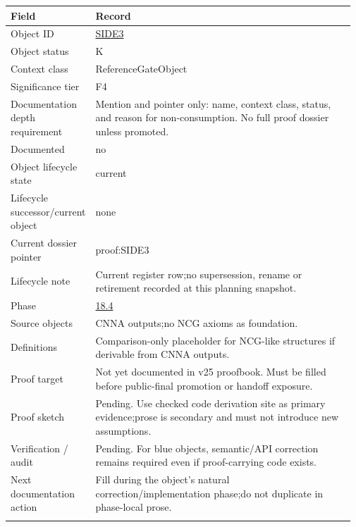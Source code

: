 \begin{longtable}{L{0.16\linewidth} L{0.81\linewidth}}
\hline
\textbf{Field} & \textbf{Record}\\
\hline
Object ID & \hyperlink{object-row-SIDE3}{SIDE3}\\
\hline\addlinespace[0.20em]
Object status & K\\
\hline\addlinespace[0.20em]
Context class & ReferenceGateObject\\
\hline\addlinespace[0.20em]
Significance tier & F4\\
\hline\addlinespace[0.20em]
Documentation depth requirement & Mention and pointer only: name, context class, status, and reason for non-consumption. No full proof dossier unless promoted.\\
\hline\addlinespace[0.20em]
Documented & no\\
\hline\addlinespace[0.20em]
Object lifecycle state & current\\
\hline\addlinespace[0.20em]
Lifecycle successor/\allowbreak{}current object & none\\
\hline\addlinespace[0.20em]
Current dossier pointer & proof:SIDE3\\
\hline\addlinespace[0.20em]
Lifecycle note & Current register row;\newline no supersession, rename or retirement recorded at this planning snapshot.\\
\hline\addlinespace[0.20em]
Phase & \hyperlink{phase-row-18-4}{18.4}\\
\hline\addlinespace[0.20em]
Source objects & CNNA outputs;\newline no NCG axioms as foundation.\\
\hline\addlinespace[0.20em]
Definitions & Comparison-only placeholder for NCG-like structures if derivable from CNNA outputs.\\
\hline\addlinespace[0.20em]
Proof target & Not yet documented in v25 proofbook. Must be filled before public-final promotion or handoff exposure.\\
\hline\addlinespace[0.20em]
Proof sketch & Pending. Use checked code derivation site as primary evidence;\newline prose is secondary and must not introduce new assumptions.\\
\hline\addlinespace[0.20em]
Verification /\allowbreak{} audit & Pending. For blue objects, semantic/\allowbreak{}API correction remains required even if proof-carrying code exists.\\
\hline\addlinespace[0.20em]
Next documentation action & Fill during the object's natural correction/\allowbreak{}implementation phase;\newline do not duplicate in phase-local prose.\\
\hline\addlinespace[0.20em]
\end{longtable}
